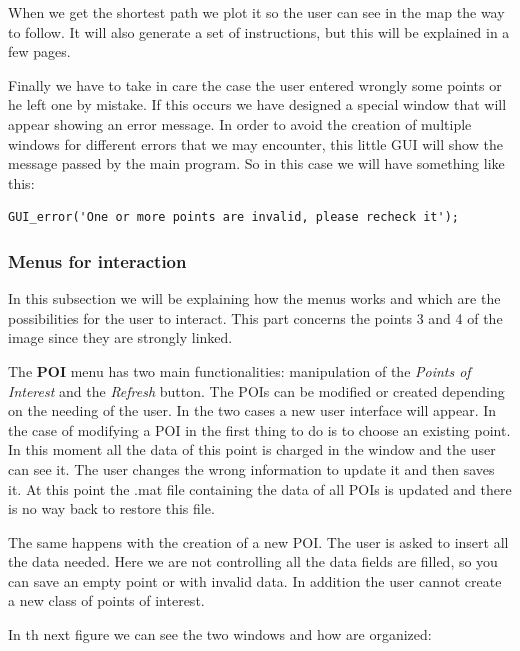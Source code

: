 \documentclass{article}
\begin{document}
When we get the shortest path we plot it so the user can see in the map the way to follow. It will also generate a set of instructions, but this will be explained in a few pages.

Finally we have to take in care the case the user entered wrongly some points or he left one by mistake. If this occurs we have designed a special window that will appear showing an error message. In order to avoid the creation of multiple windows for different errors that we may encounter, this little GUI will show the message passed by the main program. So in this case we will have something like this:

\begin{lstlisting}
GUI_error('One or more points are invalid, please recheck it');
\end{lstlisting}

\subsubsection{Menus for interaction}

In this subsection we will be explaining how the menus works and which are the possibilities for the user to interact. This part concerns the points 3 and 4 of the image since they are strongly linked.

The \textbf{POI} menu has two main functionalities: manipulation of the \textit{Points of Interest} and the \textit{Refresh} button. The POIs can be modified or created depending on the needing of the user. In the two cases a new user interface will appear. In the case of modifying a POI in the first thing to do is to choose an existing point. In this moment all the data of this point is charged in the window and the user can see it. The user changes the wrong information to update it and then saves it. At this point the .mat file containing the data of all POIs is updated and there is no way back to restore this file.

The same happens with the creation of a new POI. The user is asked to insert all the data needed. Here we are not controlling all the data fields are filled, so you can save an empty point or with invalid data. In addition the user cannot create a new class of points of interest.

In th next figure we can see the two windows and how are organized:
\end{document}
